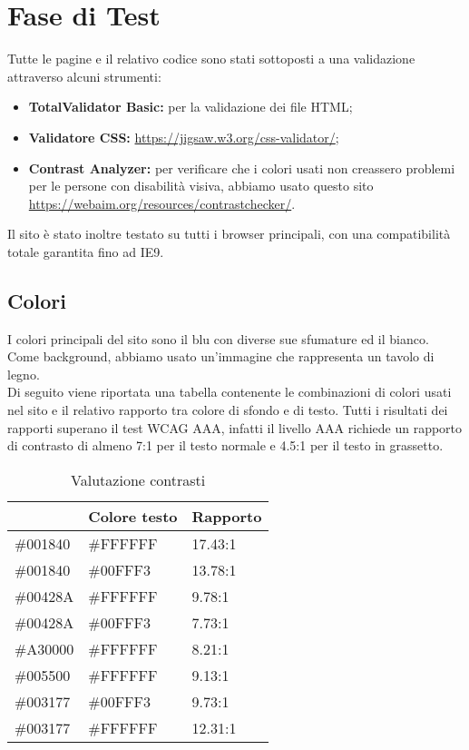 \section{Fase di Test}
Tutte le pagine e il relativo codice sono stati sottoposti a una validazione attraverso alcuni strumenti:
\begin{itemize}
	\item \textbf{TotalValidator Basic:} per la validazione dei file HTML;
	\item \textbf{Validatore CSS:} \url{https://jigsaw.w3.org/css-validator/};
	\item \textbf{Contrast Analyzer:} per verificare che i colori usati non creassero problemi per le persone con disabilità visiva, abbiamo usato questo sito \url{https://webaim.org/resources/contrastchecker/}.
\end{itemize}
Il sito è stato inoltre testato su tutti i browser principali, con una compatibilità totale garantita fino ad IE9.

\subsection{Colori} I colori principali del sito sono il blu con diverse sue sfumature ed il bianco. Come background, abbiamo usato un'immagine che rappresenta un tavolo di legno.\\
Di seguito viene riportata una tabella contenente le combinazioni di colori usati nel sito e il relativo rapporto tra colore di sfondo e di testo. Tutti i risultati dei rapporti superano il test WCAG AAA, infatti il livello AAA richiede un rapporto di contrasto di almeno 7:1 per il testo normale e 4.5:1 per il testo in grassetto.
\begin{center}
	\renewcommand{\arraystretch}{1.8}
	\begin{longtable}[H]{l l l}
		\caption{Valutazione contrasti}\\
		\rowcolor[HTML]{009ABB}
		\multicolumn{1}{c}{\color[HTML]{FFFFFF} \textbf{Colore sfondo}} &
		\multicolumn{1}{c}{\color[HTML]{FFFFFF} \textbf{Colore testo}} &
		\multicolumn{1}{c}{\color[HTML]{FFFFFF} \textbf{Rapporto}} \\
		\endhead
		\#001840 & \#FFFFFF & 17.43:1\\
		\#001840 & \#00FFF3 & 13.78:1\\
		\#00428A & \#FFFFFF & 9.78:1\\
		\#00428A & \#00FFF3 & 7.73:1\\
		\#A30000 & \#FFFFFF & 8.21:1\\
		\#005500 & \#FFFFFF & 9.13:1\\
		\#003177 & \#00FFF3 & 9.73:1\\
		\#003177 & \#FFFFFF & 12.31:1\\
	\end{longtable}
\end{center}